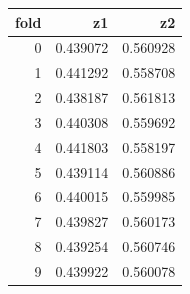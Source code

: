 \begin{tabular}{rrr}
\toprule
fold & z1 & z2 \\
\midrule
0 & 0.439072 & 0.560928 \\
1 & 0.441292 & 0.558708 \\
2 & 0.438187 & 0.561813 \\
3 & 0.440308 & 0.559692 \\
4 & 0.441803 & 0.558197 \\
5 & 0.439114 & 0.560886 \\
6 & 0.440015 & 0.559985 \\
7 & 0.439827 & 0.560173 \\
8 & 0.439254 & 0.560746 \\
9 & 0.439922 & 0.560078 \\
\bottomrule
\end{tabular}

